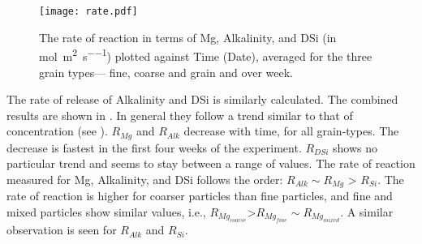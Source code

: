 \begin{figure}[h]
\texttt{[image: rate.pdf]}
\centering
\caption{The rate of reaction in terms of Mg, Alkalinity, and DSi (in \si{\mole\per\square\metre\per\second}) plotted against Time (Date), averaged for the three grain types--- fine, coarse and grain and over week.}
\label{fig:rate_Mg_al_si}

\end{figure}

\noindent The rate of release of Alkalinity and DSi is similarly calculated. The combined results are shown in . In general they follow a trend similar to that of concentration (see ). $R_{Mg}$ and $R_{Alk}$ decrease with time, for all grain-types. The decrease is fastest in the first four weeks of the experiment. $R_{DSi}$ shows no particular trend and seems to stay between a range of values. The rate of reaction measured for Mg, Alkalinity, and DSi follows the order: $R_{Alk} \sim R_{Mg}$ > $R_{Si}$. The rate of reaction is higher for coarser particles than fine particles, and fine and mixed particles show similar values, i.e., $R_{Mg_{coarse}}$>$R_{Mg_{fine}}\sim R_{Mg_{mixed}}$. A similar observation is seen for $R_{Alk}$ and $R_{Si}$.\\

